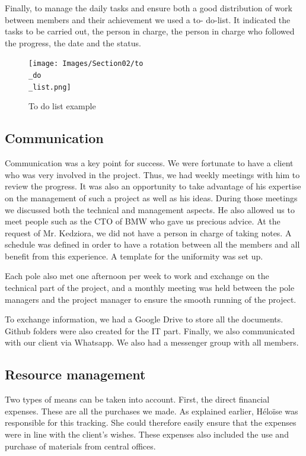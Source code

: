 \bigbreak
Finally, to manage the daily tasks and ensure both a good distribution of work between members and their achievement we used a to- do-list. It indicated the tasks to be carried out, the person in charge, the person in charge who followed the progress, the date and the status. 

\begin{figure}[ht]
    \centering
    \texttt{[image: Images/Section02/to\\\_do\\\_list.png]}
    \caption{To do list example}
    \label{fig:ToDoList}
\end{figure}

\subsection{Communication}

Communication was a key point for success. We were fortunate to have a client who was very involved in the project. Thus, we had weekly meetings with him to review the progress. It was also an opportunity to take advantage of his expertise on the management of such a project as well as his ideas. During those meetings we discussed both the technical and management aspects. He also allowed us to meet people such as the CTO of BMW who gave us precious advice. At the request of Mr. Kedziora, we did not have a person in charge of taking notes. A schedule was defined in order to have a rotation between all the members and all benefit from this experience. A template for the uniformity was set up. 

\bigbreak
Each pole also met one afternoon per week to work and exchange on the technical part of the project, and a monthly meeting was held between the pole managers and the project manager to ensure the smooth running of the project. 

\bigbreak
To exchange information, we had a Google Drive to store all the documents. Github folders were also created for the IT part. Finally, we also communicated with our client via Whatsapp. We also had a messenger group with all members. 

\subsection{Resource management}

Two types of means can be taken into account. First, the direct financial expenses. These are all the purchases we made. As explained earlier, Héloïse was responsible for this tracking. She could therefore easily ensure that the expenses were in line with the client's wishes. These expenses also included the use and purchase of materials from central offices. 

